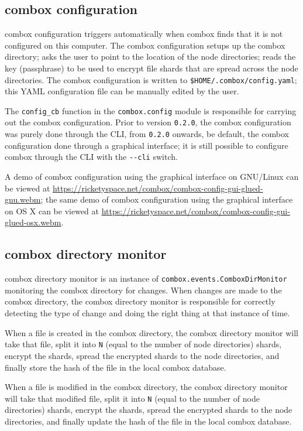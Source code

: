 \subsection{combox configuration}\label{sec:3-combox-config}

combox configuration triggers automatically when combox finds that it
is not configured on this computer. The combox configuration setups up
the combox directory; asks the user to point to the location of the
node directories; reads the key (passphrase) to be used to encrypt
file shards that are spread across the node directories. The combox
configuration is written to
\verb+$HOME/.combox/config.yaml+; this YAML configuration file can be
manually edited by the user.

The \verb+config_cb+ function in the \verb+combox.config+ module is
responsible for carrying out the combox configuration. Prior to
version \verb+0.2.0+, the combox configuration was purely done through
the CLI, from \verb+0.2.0+ onwards, be default, the combox
configuration done through a graphical interface; it is still possible
to configure combox through the CLI with the \verb+--cli+ switch.

A demo of combox configuration using the graphical interface on
GNU/Linux can be viewed at
\url{https://ricketyspace.net/combox/combox-config-gui-glued-gnu.webm};
the same demo of combox configuration using the graphical interface on
OS X can be viewed at
\url{https://ricketyspace.net/combox/combox-config-gui-glued-osx.webm}.

\subsection{combox directory monitor}\label{sec:3-combox-cdirm}

combox directory monitor is an instance of
\verb+combox.events.ComboxDirMonitor+ monitoring the combox directory
for changes. When changes are made to the combox directory, the combox
directory monitor is responsible for correctly detecting the type of
change and doing the right thing at that instance of time.

When a file is created in the combox directory, the combox directory
monitor will take that file, split it into \verb+N+ (equal to the
number of node directories) shards, encrypt the shards, spread the
encrypted shards to the node directories, and finally store the hash
of the file in the local combox database.

When a file is modified in the combox directory, the combox directory
monitor will take that modified file, split it into \verb+N+ (equal to
the number of node directories) shards, encrypt the shards, spread the
encrypted shards to the node directories, and finally update the hash
of the file in the local combox database.

